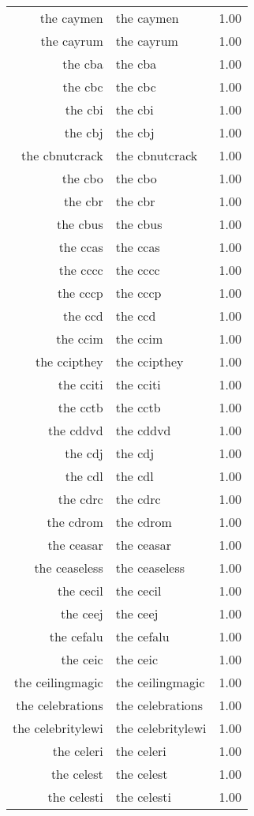 \begin{table}[ht]
\begin{tabular}{rlr}
  the caymen & the caymen & 1.00 \\ 
  the cayrum & the cayrum & 1.00 \\ 
  the cba & the cba & 1.00 \\ 
  the cbc & the cbc & 1.00 \\ 
  the cbi & the cbi & 1.00 \\ 
  the cbj & the cbj & 1.00 \\ 
  the cbnutcrack & the cbnutcrack & 1.00 \\ 
  the cbo & the cbo & 1.00 \\ 
  the cbr & the cbr & 1.00 \\ 
  the cbus & the cbus & 1.00 \\ 
  the ccas & the ccas & 1.00 \\ 
  the cccc & the cccc & 1.00 \\ 
  the cccp & the cccp & 1.00 \\ 
  the ccd & the ccd & 1.00 \\ 
  the ccim & the ccim & 1.00 \\ 
  the ccipthey & the ccipthey & 1.00 \\ 
  the cciti & the cciti & 1.00 \\ 
  the cctb & the cctb & 1.00 \\ 
  the cddvd & the cddvd & 1.00 \\ 
  the cdj & the cdj & 1.00 \\ 
  the cdl & the cdl & 1.00 \\ 
  the cdrc & the cdrc & 1.00 \\ 
  the cdrom & the cdrom & 1.00 \\ 
  the ceasar & the ceasar & 1.00 \\ 
  the ceaseless & the ceaseless & 1.00 \\ 
  the cecil & the cecil & 1.00 \\ 
  the ceej & the ceej & 1.00 \\ 
  the cefalu & the cefalu & 1.00 \\ 
  the ceic & the ceic & 1.00 \\ 
  the ceilingmagic & the ceilingmagic & 1.00 \\ 
  the celebrations & the celebrations & 1.00 \\ 
  the celebritylewi & the celebritylewi & 1.00 \\ 
  the celeri & the celeri & 1.00 \\ 
  the celest & the celest & 1.00 \\ 
  the celesti & the celesti & 1.00 \\ 

\end{tabular}
\end{table}
